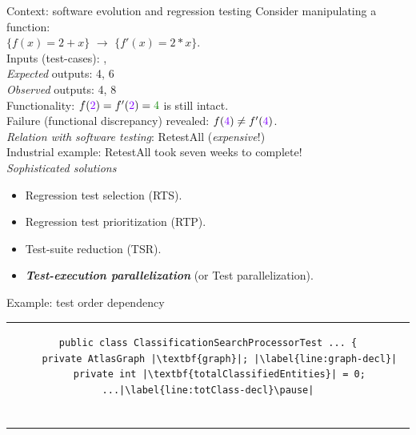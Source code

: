 \documentclass{beamer}
\begin{document}
{\begin{frame}{Context: software evolution and regression testing}
	{\rsm Consider manipulating a function}:\\
	$\{f(x)=2+x\}$ $\rightarrow$ $\{f'(x)=2*x\}$.\\
	\vspace{0.3cm}
	\pause
	Inputs (test-cases): {}, {}\\
	\textit{Expected} outputs: {\color{indiagreen}4}, {\color{indiagreen}6}\\\pause
	\textit{Observed} outputs: {\color{indiagreen}4}, {\color{red}8}\\
	\vspace{0.3cm}\pause
	{\color{indiagreen}Functionality}: $f({\rsm 2})=f'({\rsm 2})=\color{indiagreen}4$ is still intact.\\
	\vspace{0.3cm}\pause
	\vspace{-4mm}
	{\color{red} Failure} (functional discrepancy) revealed: $f({\rsm 4})\neq f'({\rsm 4})$.\\
	\vspace{0.3cm}\pause
	{\textit{Relation with software testing}: RetestAll ({\color{red}\textit{expensive}!})}\\
	Industrial example: RetestAll took seven weeks to complete!\onslide<6->\footnotemark\\\pause
	\vfill
	\textit{Sophisticated solutions}
	\begin{itemize}
		\item{Regression test {\rsm selection} (RTS).}
		\item{Regression test {\rsm prioritization} (RTP).}
		\item{Test-suite {\rsm reduction} (TSR).}\pause
		\item{\textbf{\color{blue}\textit{Test-execution parallelization}} (or Test parallelization).}
	\end{itemize}
\end{frame}

\begin{frame}[fragile]{Example: test order dependency}
\vspace{-13mm}
\begin{center}
	\begin{table}[h]
		\centering
		\begin{tabular}{c}
\begin{lstlisting}[caption=Test order dependency on the project \texttt{\textbf{Atlas}} (commit\# acb9880).,captionpos=b,label={lst:rq3-example},keywords={totalClassifiedEntities,searchByALLTag,searchByALLTagAndIndexSysFiltersToTestLimit,params,graph},escapechar=|,tabsize=1]
public class ClassificationSearchProcessorTest ... {
	private AtlasGraph |\textbf{graph}|; |\label{line:graph-decl}|
	private int |\textbf{totalClassifiedEntities}| = 0; ...|\label{line:totClass-decl}\pause|
	

\end{lstlisting}
\end{tabular}
\end{table}
\end{center}
\end{frame}}
\end{document}
